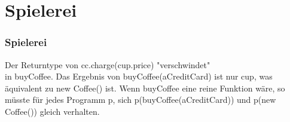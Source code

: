 \section[Section]{Spielerei}
	\begin{frame}[fragile]
	\frametitle{Spielerei}
	\begin{tcolorbox}[colback=blue!5,colframe=brightcerulean,title=RT in Beispiel1]
		Der Returntype von cc.charge(cup.price) "verschwindet"\\
		in buyCoffee. Das Ergebnis von buyCoffee(aCreditCard) ist
		nur cup, was äquivalent zu new Coffee() ist. Wenn buyCoffee eine reine 				Funktion wäre, so müsste für jedes Programm p, sich 								p(buyCoffee(aCreditCard)) und p(new Coffee()) gleich verhalten.
	\end{tcolorbox}
\end{frame}

			
